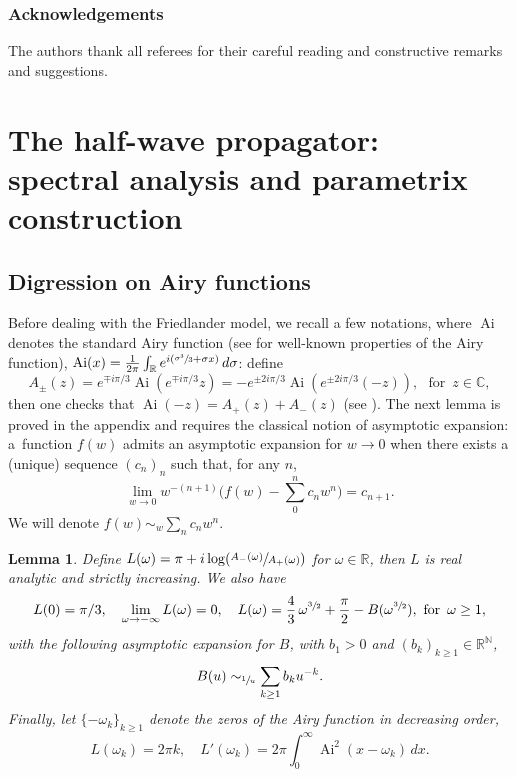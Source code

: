\documentclass[JEP,XML,SOM,Unicode,NoEqCountersInSection,NoFloatCountersInSection,published]{cedram}
\newcommand{\Psfrac}[2]{(\sfrac{#1}{#2})}
\DeclareMathOperator{\Ai}{Ai}
\newcommand\N{{\mathbb N}}
\newcommand\R{{\mathbb R}}
\theoremstyle{plain}
\newtheorem{lemma}{Lemma}
\theoremstyle{definition}
\begin{document}
\subsubsection*{Acknowledgements}
The authors thank all referees for their careful reading and constructive remarks and suggestions.

\section{The half-wave propagator:\texorpdfstring{\\}{cr} spectral analysis and parametrix construction}

\subsection{Digression on Airy functions}
Before dealing with the Friedlander model, we recall a few notations, where $\Ai$ denotes the standard Airy function (see \eg \cite{AFbook} for well-known properties of the Airy function), $ \Ai(x)=\frac 1 {2\pi } \int_{\R} e^{ i (\sfrac{\sigma^{3}}{3}+\sigma x)} \,d\sigma$: define
\begin{equation}
\label{eq:Apm}
A_\pm(z)=e^{\mp i\pi/3} \Ai(e^{\mp i\pi/3} z)=-e^{\pm 2i\pi/3} \Ai(e^{\pm 2i\pi/3} (-z)),\,\,\text{ for } \,
z\in \mathbb{C},
\end{equation}
then one checks that $\Ai(-z)=A_+(z)+A_-(z)$ (see \cite[(2.3)]{AFbook}). The next lemma is proved in the appendix and requires the classical notion of asymptotic expansion: a~function $f(w)$ admits an asymptotic expansion for $w\to 0$ when there exists a (unique) sequence $(c_{n})_{n}$ such that, for any $n$,
\[
\lim_{w\to 0} w^{-(n+1)}\biggl(f(w)-\sum_{0}^{n} c_{n} w^{n}\biggr)=c_{n+1}.
\]
We will denote $ f(w)\sim_{w} \sum_{n} c_{n} w^{n}$.
\begin{lemma}
\label{lemL}
Define
$L(\omega)=\pi+i\log \Psfrac{A_-(\omega)}{A_+(\omega)}$ for $\omega \in \R$,
then $L$ is real analytic and strictly increasing. We also
have
\begin{equation}
\label{eq:propL}
L(0)=\pi/3,\quad\lim_{\omega\to -\infty} L(\omega)=0,\quad
L(\omega)=\frac 4 3\, \omega^{\sfrac 3 2}+\frac{\pi}{2}-B(\omega^{\sfrac 3 2}),\,\,\text{for } \,\omega\geq 1,
\end{equation}
with the following asymptotic expansion for $B$, with $b_{1}>0$ and $(b_{k})_{k\geq 1}\in \R^{\N}$,
\begin{equation}
\label{eq:B}
B(u)\sim_{\sfrac 1u } \sum_{k\geq 1} b_k u^{-k}.
\end{equation}
Finally, let $\{-\omega_k\}_{k\geq 1}$ denote the zeros of the Airy function in decreasing order,
\begin{equation}
\label{eq:propL2}
L(\omega_k)=2\pi k,\quad L'(\omega_k)=2\pi \int_0^\infty \Ai^2(x-\omega_k) \,dx.
\end{equation}
\end{lemma}
\end{document}
